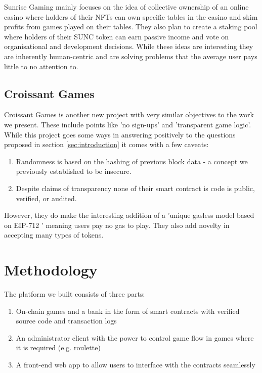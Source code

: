 \documentclass[10pt,journal,compsoc]{IEEEtran}
\begin{document}
Sunrise Gaming mainly focuses on the idea of collective ownership of an online casino where holders of their NFTs can own specific tables in the casino and skim profits from games played on their tables. They also plan to create a staking pool where holders of their SUNC token can earn passive income and vote on organisational and development decisions. While these ideas are interesting they are inherently human-centric and are solving problems that the average user pays little to no attention to.

\subsection{Croissant Games}
Croissant Games \cite{croissant_games_croissant_games} is another new project with very similar objectives to the work we present. These include points like 'no sign-ups' and 'transparent game logic'. While this project goes some ways in answering positively to the questions proposed in section \ref{sec:introduction} it comes with a few caveats:

\begin{enumerate}
    \item Randomness is based on the hashing of previous block data - a concept we previously established to be insecure. 
    \item Despite claims of transparency none of their smart contract is code is public, verified, or audited.
\end{enumerate}

However, they do make the interesting addition of a 'unique gasless model based on EIP-712 \cite{eip_712:_ethereum_typed_structured_data_hashing_and_signing}' meaning users pay no gas to play. They also add novelty in accepting many types of tokens.
\section{Methodology}
The platform we built consists of three parts: 
\begin{enumerate}
    \item On-chain games and a bank in the form of smart contracts with verified source code and transaction logs
    \item An administrator client with the power to control game flow in games where it is required (e.g. roulette)
    \item A front-end web app to allow users to interface with the contracts seamlessly 
\end{enumerate}
\end{document}
